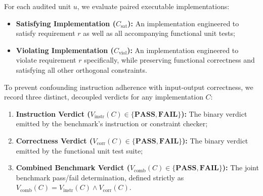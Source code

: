 \documentclass[runningheads]{llncs}
\begin{document}
For each audited unit $u$, we evaluate paired executable implementations:
\begin{itemize}[leftmargin=*]
    \item \textbf{Satisfying Implementation ($C_{\text{sat}}$):} An implementation engineered to satisfy requirement $r$ as well as all accompanying functional unit tests;
    \item \textbf{Violating Implementation ($C_{\text{viol}}$):} An implementation engineered to violate requirement $r$ specifically, while preserving functional correctness and satisfying all other orthogonal constraints.
\end{itemize}

To prevent confounding instruction adherence with input-output correctness, we record three distinct, decoupled verdicts for any implementation $C$:
\begin{enumerate}[leftmargin=*]
    \item \textbf{Instruction Verdict ($V_{\text{instr}}(C) \in \{\textbf{PASS}, \textbf{FAIL}\}$):} The binary verdict emitted by the benchmark's instruction or constraint checker;
    \item \textbf{Correctness Verdict ($V_{\text{corr}}(C) \in \{\textbf{PASS}, \textbf{FAIL}\}$):} The binary verdict emitted by the functional unit test suite;
    \item \textbf{Combined Benchmark Verdict ($V_{\text{comb}}(C) \in \{\textbf{PASS}, \textbf{FAIL}\}$):} The joint benchmark pass/fail determination, defined strictly as $V_{\text{comb}}(C) = V_{\text{instr}}(C) \land V_{\text{corr}}(C)$.
\end{enumerate}
\end{document}
